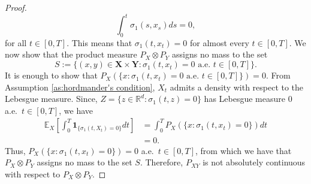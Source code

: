 \documentclass[10pt,a4paper]{amsart}
\begin{document}
\begin{proof}
    \[
        \int_0^t\sigma_1(s,x_s)ds = 0,
    \]
    for all $t\in[0,T]$. This means that $\sigma_1(t,x_t) = 0$ for almost every $t\in[0,T]$. We now show that the product measure $P_X\otimes P_Y$ assigns no mass to the set
    \[
        S := \{(x,y)\in\mathbf{X\times Y}: \sigma_1(t,x_t) = 0 \text{ a.e.\ } t\in[0,T]\}.
    \]
    It is enough to show that $P_X(\{x:\sigma_1(t,x_t) = 0 \text{ a.e.\ } t\in[0,T]\}) = 0$. From Assumption \ref{as:hordmander's condition}, $X_t$ admits a density with respect to the Lebesgue measure. Since, $Z = \{z\in\mathbb{R}^d:\sigma_1(t,z) = 0\}$ has Lebesgue measure 0 a.e.\ $t\in[0,T]$, we have
    \begin{align*}
\mathbb{E}_X\left[\int_0^T\mathbf{1}_{\{\sigma_1(t,X_t)=0\}}dt\right] &= \int_0^TP_X(\{x:\sigma_1(t,x_t)=0\})dt\\ &=0.
    \end{align*}
    Thus, $P_X(\{x:\sigma_1(t,x_t)=0\}) = 0$ a.e.\ $t\in[0,T]$, from which we have that $P_X \otimes P_Y$ assigns no mass to the set $S$. Therefore, $P_{XY}$ is not absolutely continuous with respect to $P_X \otimes P_Y$.
\end{proof}
\end{document}
